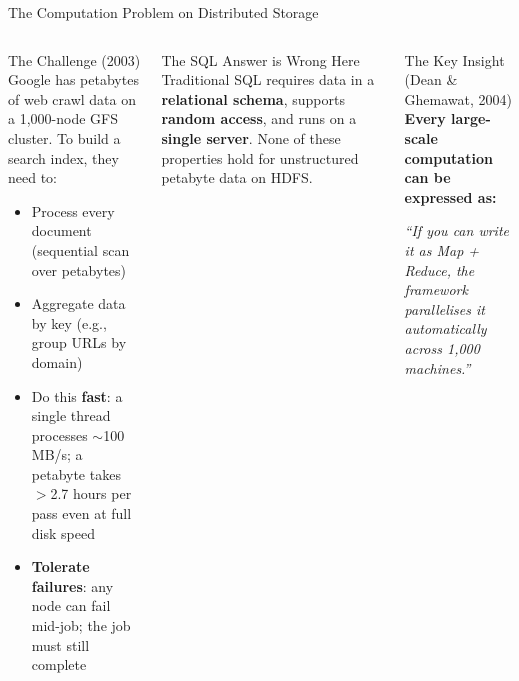 \documentclass[aspectratio=169,10pt]{beamer}
\begin{document}
\begin{frame}{The Computation Problem on Distributed Storage}
  \begin{columns}[T]
      \begin{block}{The Challenge (2003)}
        Google has petabytes of web crawl data on a 1{,}000-node GFS cluster.  To build a search index, they need to:
        \begin{itemize}
          \item Process every document (sequential scan over petabytes)
          \item Aggregate data by key (e.g., group URLs by domain)
          \item Do this \textbf{fast}: a single thread processes $\sim$100 MB/s; a petabyte takes $>$2.7 hours per pass even at full disk speed
          \item \textbf{Tolerate failures}: any node can fail mid-job; the job must still complete
        \end{itemize}
      \end{block}
      \vspace{4pt}
      \begin{alertblock}{The SQL Answer is Wrong Here}
        Traditional SQL requires data in a \textbf{relational schema}, supports \textbf{random access}, and runs on a \textbf{single server}.  None of these properties hold for unstructured petabyte data on HDFS.
      \end{alertblock}

      \begin{exampleblock}{The Key Insight (Dean \& Ghemawat, 2004)}
        \large\centering
        \vspace{4pt}
        \textbf{Every large-scale computation can be expressed as:}
        \vspace{8pt}
        \vspace{8pt}
        \textit{``If you can write it as Map + Reduce, the framework parallelises it automatically across 1{,}000 machines.''}
      \end{exampleblock}
  \end{columns}
\end{frame}
\end{document}
